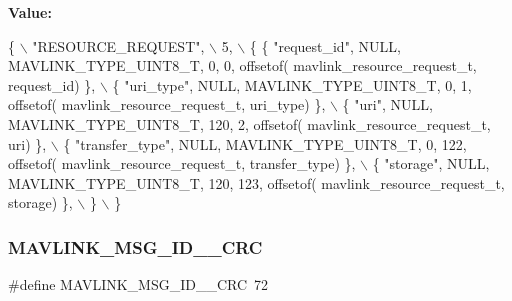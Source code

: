 {\bfseries Value\+:}
\begin{DoxyCode}
\{ \(\backslash\)
    \textcolor{stringliteral}{"RESOURCE\_REQUEST"}, \(\backslash\)
    5, \(\backslash\)
    \{  \{ \textcolor{stringliteral}{"request\_id"}, NULL, MAVLINK_TYPE_UINT8_T, 0, 0, offsetof(
      mavlink_resource_request_t, request\_id) \}, \(\backslash\)
         \{ \textcolor{stringliteral}{"uri\_type"}, NULL, MAVLINK_TYPE_UINT8_T, 0, 1, offsetof(
      mavlink_resource_request_t, uri\_type) \}, \(\backslash\)
         \{ \textcolor{stringliteral}{"uri"}, NULL, MAVLINK_TYPE_UINT8_T, 120, 2, offsetof(
      mavlink_resource_request_t, uri) \}, \(\backslash\)
         \{ \textcolor{stringliteral}{"transfer\_type"}, NULL, MAVLINK_TYPE_UINT8_T, 0, 122, offsetof(
      mavlink_resource_request_t, transfer\_type) \}, \(\backslash\)
         \{ \textcolor{stringliteral}{"storage"}, NULL, MAVLINK_TYPE_UINT8_T, 120, 123, offsetof(
      mavlink_resource_request_t, storage) \}, \(\backslash\)
         \} \(\backslash\)
\}
\end{DoxyCode}
\mbox{\label{mavlink__msg__resource__request_8h_a4eb6d34aa7446cdbfd7ec4c6eb37b137}} 
\subsubsection{M\+A\+V\+L\+I\+N\+K\+\_\+\+M\+S\+G\+\_\+\+I\+D\+\_\+\_\+\+C\+RC}
{\footnotesize\ttfamily \#define M\+A\+V\+L\+I\+N\+K\+\_\+\+M\+S\+G\+\_\+\+I\+D\+\_\+\_\+\+C\+RC~72}

\mbox{\label{mavlink__msg__resource__request_8h_a06daf68f89acfb1ccb763028579e7535}} 
